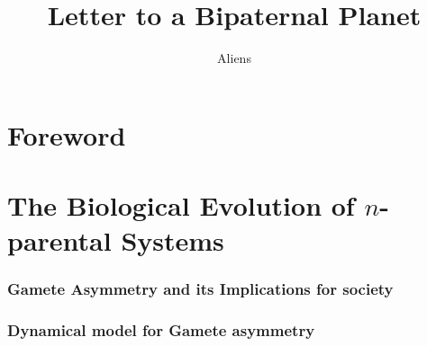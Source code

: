 \documentclass{report}
\begin{document}
\title{Letter to a Bipaternal Planet}
\author{Aliens}




\maketitle
\chapter*{Foreword}



\chapter{The Biological Evolution of $n$-parental Systems}











%

\subsection{Gamete Asymmetry and its Implications for society}


\subsection{Dynamical model for Gamete asymmetry}

\end{document}
